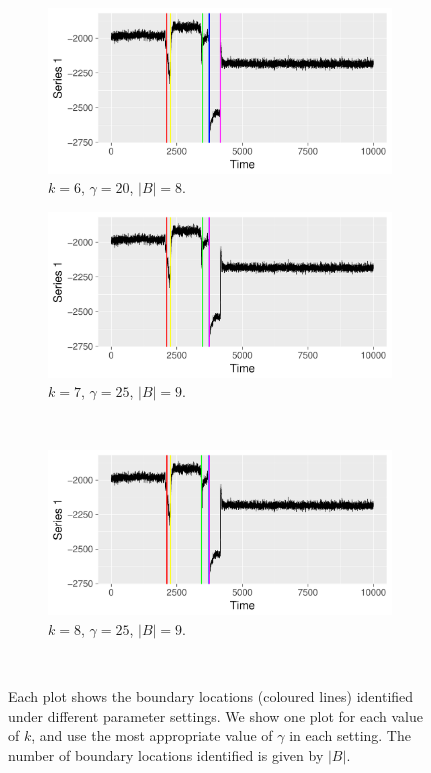 \begin{figure}[H]
  \begin{subfigure}{0.45\textwidth}
    \centering
    \includegraphics[width = \textwidth]{best/best_k_6_gamma_20_colour.pdf}
    \caption{$k = 6 $, $\gamma = 20$, $|B| = 8$.}
  \label{fig:best_6}
  \end{subfigure}
 \begin{subfigure}{0.45\textwidth}
    \centering
    \includegraphics[width = \textwidth]{best/best_k_7_gamma_25_colour.pdf}
    \caption{$k = 7 $, $\gamma = 25$, $|B| = 9$.}
  \label{fig:best_7}
  \end{subfigure} \\

 \begin{subfigure}{0.45\textwidth}
    \centering
    \includegraphics[width = \textwidth]{best/best_k_8_gamma_25_colour.pdf}
    \caption{$k = 8 $, $\gamma = 25$, $|B| = 9$.}
  \label{fig:best_8}
  \end{subfigure} \\
    \caption{Each plot shows the boundary locations (coloured lines) identified  under different parameter settings. We show one plot for each value of $k$, and use the most appropriate value of $\gamma$ in each setting. The number of boundary locations identified is given by $|B|$.}
  \label{fig:best_k_gamma}
\end{figure}

